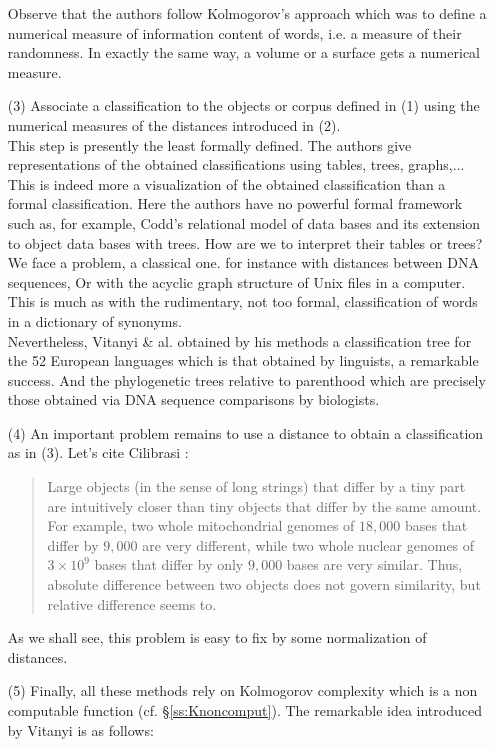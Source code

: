 \begin{enumerate}
Observe that the authors follow Kolmogorov's approach
which was to define a numerical measure of information content of words, i.e. a measure of their randomness.
In exactly the same way, a volume or a surface gets a numerical
measure.
\item[(3)]
Associate a classification to the objects or corpus defined in
(1) using the numerical measures of the distances introduced in (2).
\\
This step is presently the least formally defined.
The authors give representations of the obtained classifications
using tables, trees, graphs,...
This is indeed more a visualization of the obtained classification
than a formal classification.
Here the authors have no powerful formal framework such as,
for example, Codd's relational model of data bases and its extension
to object data bases with trees.
How are we to interpret their tables or trees?
We face a problem, a classical one.
for instance with distances between DNA sequences,
Or with the acyclic graph structure of Unix files in a computer.
\\
This is much as with the rudimentary, not too formal, classification
of words in a dictionary of synonyms.
\\
Nevertheless, Vitanyi \& al. obtained by his methods
a classification tree for the 52 European languages which is that
obtained by linguists, a remarkable success.
And the phylogenetic trees relative to parenthood which are precisely
those obtained via DNA sequence comparisons by biologists.
\item[(4)]
An important problem remains to use a distance to obtain
a classification as in (3). Let's cite Cilibrasi \cite{cilibrasi03}:
\begin{quote}
Large objects (in the sense of long strings) that differ
by a tiny part are intuitively closer than tiny objects that
differ by the same amount.
For example, two whole mitochondrial genomes of $18,000$ bases
that differ by $9,000$ are very different, while two whole nuclear
genomes of $3\times 10^9$ bases that differ by only $9,000$ bases
are very similar.
Thus, absolute difference between two objects does not govern
similarity, but relative difference seems to.
\end{quote}
As we shall see, this problem is easy to fix by some normalization
of distances.
\item[(5)]
Finally, all these methods rely on Kolmogorov complexity which
is a non computable function (cf. \S\ref{ss:Knoncomput}).
The remarkable idea introduced by Vitanyi is as follows:

\end{enumerate}
